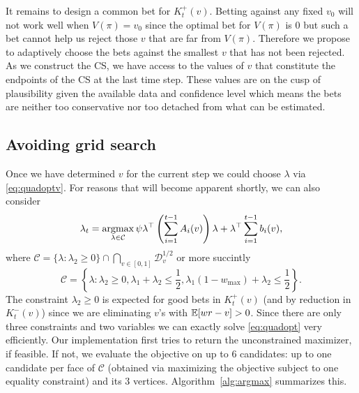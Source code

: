 It remains to design a common bet for $K_t^{+}(v)$.  Betting against any fixed
$v_0$ will not work well when $V(\pi)=v_0$ since the optimal bet for $V(\pi)$
is 0 but such a bet cannot help us reject those $v$ that are far from $V(\pi)$.
Therefore we propose to adaptively choose the bets against the smallest $v$
that has not been rejected. As we construct the CS, we have access to the values of $v$ that constitute the
endpoints of the CS at the last time step. These values are on
the cusp of plausibility given the available data and confidence level which
means the bets are neither too conservative nor too detached from what can be
estimated.

\subsection{Avoiding grid search}
\label{sec:avoid-grid}
Once we have determined $v$ for the current step we could choose $\lambda$ via
\eqref{eq:quadoptv}. For reasons that will become apparent shortly, we can also
consider
\begin{equation}
\lambda_t = \operatorname*{argmax}_{\lambda \in \mathcal{C}}
\psi  \lambda^\top \left(\sum_{i=1}^{t-1} A_i(v)\right) \lambda 
+ \lambda^\top \sum_{i=1}^{t-1} b_i(v),
\label{eq:quadopt}
\end{equation}
where $\mathcal{C}=\{\lambda: \lambda_2 \geq 0\}\cap \bigcap_{v\in [0,1]} \mathcal{D}_v^{1/2}$
or more succintly
$$
\mathcal{C} = \left\{\lambda: \lambda_2\geq 0, 
\lambda_1 + \lambda_2 \leq \frac{1}{2},
\lambda_1 \left(1-w_{\max}\right) + \lambda_2 \leq  \frac{1}{2}
\right\}.
$$
The constraint $\lambda_2\geq 0$ is expected for good bets in $K_t^+(v)$ (and
by reduction in $K_t^-(v)$) since we are eliminating $v$'s with $\mathbb{E}[wr-v]>0$.
Since there are only three constraints and two variables we can exactly solve
\eqref{eq:quadopt} very efficiently. Our implementation first tries to
return the unconstrained maximizer, if feasible.  If not, we evaluate the
objective on up to 6 candidates: up to one candidate per face of $\mathcal{C}$
(obtained via maximizing the objective subject to one equality constraint) and
its 3 vertices. Algorithm~\ref{alg:argmax} summarizes this.

